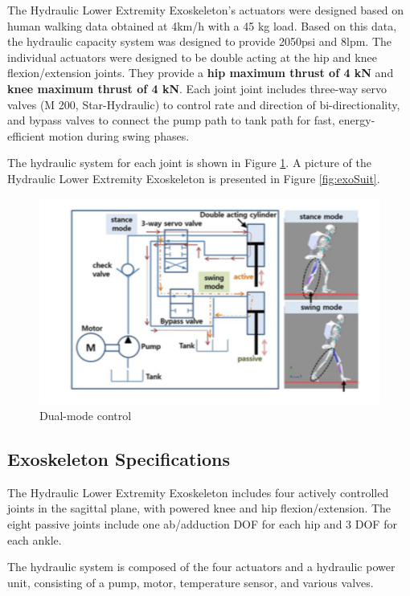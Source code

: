 \begin{refsection}
The Hydraulic Lower Extremity Exoskeleton's actuators were designed based on human walking data obtained at 4km/h with a 45 kg load.  Based on this data, the hydraulic capacity system was designed to provide 2050psi and 8lpm.  The individual actuators were designed to be double acting at the hip and knee flexion/extension joints. They provide a {\bf hip maximum thrust of 4 kN} and {\bf knee maximum thrust of 4 kN}.  Each joint joint includes three-way servo valves (M 200, Star-Hydraulic) to control rate and direction of bi-directionality, and bypass valves to connect the pump path to tank path for fast, energy-efficient motion during swing phases.   

The hydraulic system for each joint is shown in Figure \ref{fig:hydraulicSys}.
A picture of the Hydraulic Lower Extremity Exoskeleton is presented in Figure \ref{fig:exoSuit}.
\begin{figure}[thpb]
\centering
\includegraphics[width=3.in]{exos/figs/hydLowerExrem/hydraulicSys}
  \caption{Dual-mode control}
 \label{fig:hydraulicSys}   
 \end{figure} 


 

 
 \subsection{Exoskeleton Specifications}
 
 The Hydraulic Lower Extremity Exoskeleton includes four actively controlled joints in the sagittal plane, with powered knee and hip flexion/extension.  The eight passive joints include one ab/adduction DOF for each hip and 3 DOF for each ankle.
 
 The hydraulic system is composed of the four actuators and a hydraulic power unit, consisting of a pump, motor, temperature sensor, and various valves.
 

\end{refsection}

